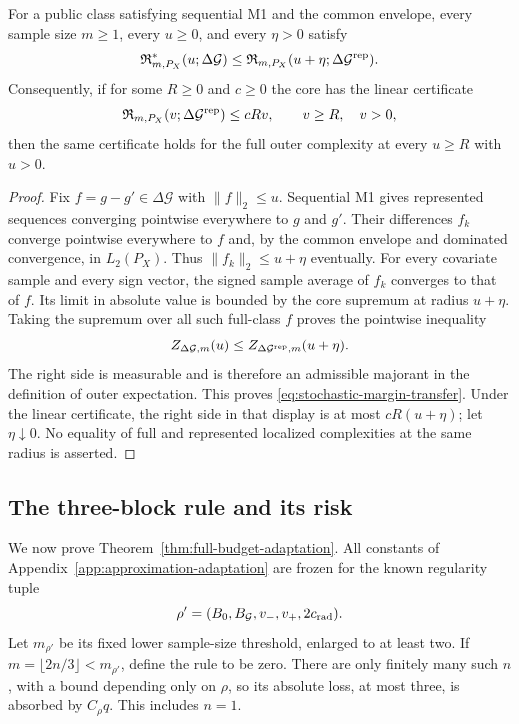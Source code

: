 \begin{lemma}
\label{lem:stochastic-full-transfer}
For a public class satisfying sequential M1 and the common envelope,
every sample size $m\ge1$, every $u\ge0$, and every $\eta>0$ satisfy
\begin{equation}
 \mathfrak R^*_{m,P_X}(u;\Delta\mathcal G)
 \le\mathfrak R_{m,P_X}(u+\eta;\Delta\mathcal G^{\rm rep}).
 \label{eq:stochastic-margin-transfer}
\end{equation}
Consequently, if for some $R\ge0$ and $c\ge0$ the core has the
linear certificate
\[
 \mathfrak R_{m,P_X}(v;\Delta\mathcal G^{\rm rep})\le cRv,
 \qquad v\ge R,\quad v>0,
\]
then the same certificate holds for the full outer complexity at
every $u\ge R$ with $u>0$.
\end{lemma}
\begin{proof}
Fix $f=g-g'\in\Delta\mathcal G$ with $\|f\|_2\le u$.
Sequential M1 gives represented sequences converging pointwise
everywhere to $g$ and $g'$. Their differences $f_k$ converge
pointwise everywhere to $f$ and, by the common envelope and
dominated convergence, in $L_2(P_X)$. Thus
$\|f_k\|_2\le u+\eta$ eventually. For every covariate sample
and every sign vector, the signed sample average of $f_k$ converges
to that of $f$. Its limit in absolute value is bounded by the core
supremum at radius $u+\eta$. Taking the supremum over all such
full-class $f$ proves the pointwise inequality
\[
 Z_{\Delta\mathcal G,m}(u)
 \le Z_{\Delta\mathcal G^{\rm rep},m}(u+\eta).
\]
The right side is measurable and is therefore an admissible
majorant in the definition of outer expectation. This proves
\eqref{eq:stochastic-margin-transfer}. Under the linear certificate,
the right side in that display is at most $cR(u+\eta)$; let
$\eta\downarrow0$. No equality of full and represented localized
complexities at the same radius is asserted.
\end{proof}

\subsection{The three-block rule and its risk}
\label{app:stochastic-wrapper}

We now prove Theorem~\ref{thm:full-budget-adaptation}. All constants
of Appendix~\ref{app:approximation-adaptation} are frozen for the
known regularity tuple
\[
 \rho'=(B_0,B_{\mathcal G},v_-,v_+,2c_{\rm rad}).
\]
Let $m_{\rho'}$ be its fixed lower sample-size threshold, enlarged
to at least two. If $m=\lfloor2n/3\rfloor<m_{\rho'}$, define the
rule to be zero. There are only finitely many such $n$, with a
bound depending only on $\rho$, so its absolute loss, at most
three, is absorbed by $C_\rho q$. This includes $n=1$.

